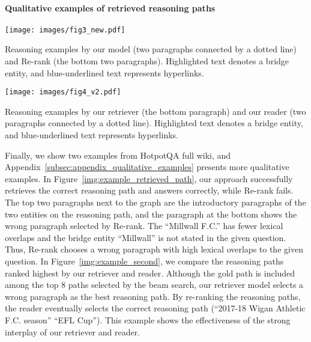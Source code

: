\documentclass{article} \usepackage{iclr2020_conference,times}
\begin{document}
\vspace{-2mm}\paragraph{Qualitative examples of retrieved  reasoning paths}
\begin{table}[tb!]
\begin{minipage}{.51\linewidth}
\makeatletter          {}  \makeatother           \texttt{[image: images/fig3\_new.pdf]}
      \caption{Reasoning examples by our model (two paragraphs connected by a dotted line) and Re-rank (the bottom two paragraphs). Highlighted text denotes a bridge entity, and blue-underlined text represents hyperlinks.
      }\label{img:example_retrieved_path}
\end{minipage}
\hspace{0.2cm}
\begin{minipage}{.45\linewidth}
    \makeatletter          {}  \makeatother           \texttt{[image: images/fig4\_v2.pdf]}
      \caption{Reasoning examples by our retriever (the bottom paragraph) and our reader (two paragraphs connected by a dotted line). Highlighted text denotes a bridge entity, and blue-underlined text represents hyperlinks.
      }\label{img:example_second}
\end{minipage}
\end{table}
Finally, we show two examples from HotpotQA full wiki, and Appendix~\ref{subsec:appendix_qualitative_examples} presents more qualitative examples.
In Figure~\ref{img:example_retrieved_path}, our approach successfully retrieves the correct reasoning path and answers correctly, while Re-rank fails. 
The top two paragraphs next to the graph are the introductory paragraphs of the two entities on the reasoning path, and the paragraph at the bottom shows the wrong paragraph selected by Re-rank.
The ``Millwall F.C.'' has fewer lexical overlaps and the bridge entity ``Millwall'' is not stated in the given question. Thus, Re-rank chooses a wrong paragraph with high lexical overlaps to the given question.
In Figure~\ref{img:example_second}, we compare the reasoning paths ranked highest by our retriever and reader. Although the gold path is included among the top 8 paths selected by the beam search, our retriever model selects a wrong paragraph as the best reasoning path. 
By re-ranking the reasoning paths, the reader eventually selects the correct reasoning path (``2017-18 Wigan Athletic F.C. season''  ``EFL Cup'').
This example shows the effectiveness of the strong interplay of our retriever and reader.
\end{document}
